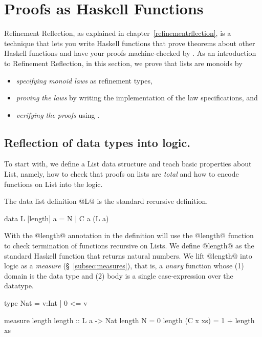 \section{Proofs as Haskell Functions}\label{sec:haskell-proofs}

Refinement Reflection, as explained in chapter~\ref{refinementrflection}, is a technique
that lets you write Haskell functions that prove theorems
about other Haskell functions and have your proofs machine-checked
by \toolname.
%
As an introduction to Refinement Reflection,
in this section, we prove that lists are monoids by
\begin{itemize}
\item \textit{specifying monoid laws} as refinement types,
\item \textit{proving the laws} by writing the implementation of the law specifications, and
\item \textit{verifying the proofs} using \toolname.
\end{itemize}

\subsection{Reflection of data types into logic.}
To start with,
we define a List data structure and
teach \toolname basic properties about List,
namely, how to check that proofs on lists are \textit{total}
and how to encode functions on List into the logic.

The data list definition @L@ is the standard recursive definition.
\begin{code}
  data L [length] a = N | C a (L a)
\end{code}
%
With the @length@ annotation in the definition \toolname
will use the @length@ function to check termination
of functions recursive on Lists.
%
We define @length@ as the standard Haskell function
that returns natural numbers.
%
We lift @length@ into logic as a \textit{measure} (\S~\ref{subsec:measures}),
that is, a \textit{unary} function whose (1) domain is the data type and
(2) body is a single case-expression over the datatype.
\begin{code}
  type Nat = {v:Int | 0 <= v}

  measure length
  length         :: L a -> Nat
  length N        = 0
  length (C x xs) = 1 + length xs
\end{code}

